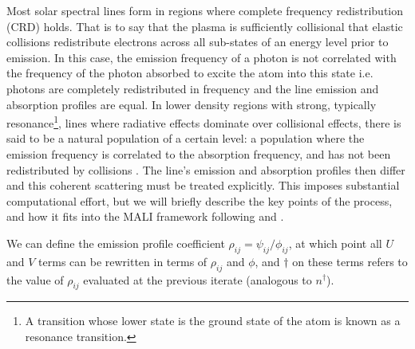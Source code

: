 Most solar spectral lines form in regions where complete frequency redistribution (CRD) holds.
That is to say that the plasma is sufficiently collisional that elastic collisions redistribute electrons across all sub-states of an energy level prior to emission.
In this case, the emission frequency of a photon is not correlated with the frequency of the photon absorbed to excite the atom into this state i.e. photons are completely redistributed in frequency and the line emission and absorption profiles are equal.
In lower density regions with strong, typically resonance\footnote{A transition whose lower state is the ground state of the atom is known as a resonance transition.}, lines where radiative effects dominate over collisional effects, there is said to be a natural population of a certain level: a population where the emission frequency is correlated to the absorption frequency, and has not been redistributed by collisions \citep{Hubeny2014}.
The line's emission and absorption profiles then differ and this coherent scattering must be treated explicitly.
This imposes substantial computational effort, but we will briefly describe the key points of the process, and how it fits into the MALI framework following \citet{Uitenbroek2001} and \citet{Hubeny2014}.

We can define the emission profile coefficient $\rho_{ij} = \psi_{ij} / \phi_{ij}$, at which point all $U$ and $V$ terms can be rewritten in terms of $\rho_{ij}$ and $\phi$, and $\dagger$ on these terms refers to the value of $\rho_{ij}$ evaluated at the previous iterate (analogous to $n^\dagger$).

